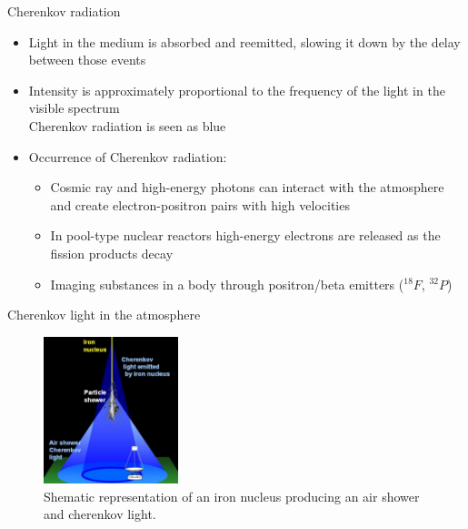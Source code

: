 \documentclass[aspectratio=1610, 10pt]{beamer}
\begin{document}
\begin{frame}{Cherenkov radiation}
  \begin{itemize}
    \item Light in the medium is absorbed and reemitted, slowing it down by the delay between those events
    \medskip
    \item Intensity is approximately proportional to the frequency of the light in the visible spectrum \\
    \rightarrow Cherenkov radiation is seen as blue
    \medskip
    \item Occurrence of Cherenkov radiation:
      \begin{itemize}
        \item Cosmic ray and high-energy photons can interact with the atmosphere and create electron-positron pairs with high velocities
        \medskip
        \item In pool-type nuclear reactors high-energy electrons are released as the fission products decay
        \medskip
        \item Imaging substances in a body through positron/beta emitters ($^{18}F$, $^{32}P$)
      \end{itemize}
  \end{itemize}
\end{frame}


\begin{frame}{Cherenkov light in the atmosphere}
  \begin{figure}
    \includegraphics[width=0.35\textwidth]{images/cherenkov_cone.png}
    \caption{Shematic representation of an iron nucleus producing an air shower and cherenkov light.}
  \end{figure}
\end{frame}
\end{document}
